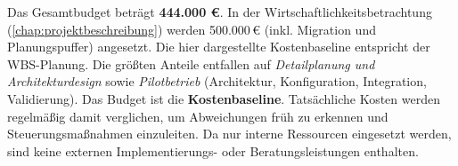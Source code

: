 Das Gesamtbudget beträgt \textbf{444.000 €}. In der
Wirtschaftlichkeitsbetrachtung (\autoref{chap:projektbeschreibung}) werden
500.000\,€ (inkl. Migration und Planungspuffer) angesetzt. Die hier
dargestellte Kostenbaseline entspricht der \ac{WBS}-Planung. Die größten
Anteile entfallen auf \emph{Detailplanung und Architekturdesign} sowie
\emph{Pilotbetrieb} (Architektur, Konfiguration, Integration, Validierung).
Das Budget ist die \textbf{Kostenbaseline}. Tatsächliche Kosten werden
regelmäßig damit verglichen, um Abweichungen früh zu erkennen und
Steuerungsmaßnahmen einzuleiten. Da nur interne Ressourcen eingesetzt werden,
sind keine externen Implementierungs- oder Beratungsleistungen enthalten.